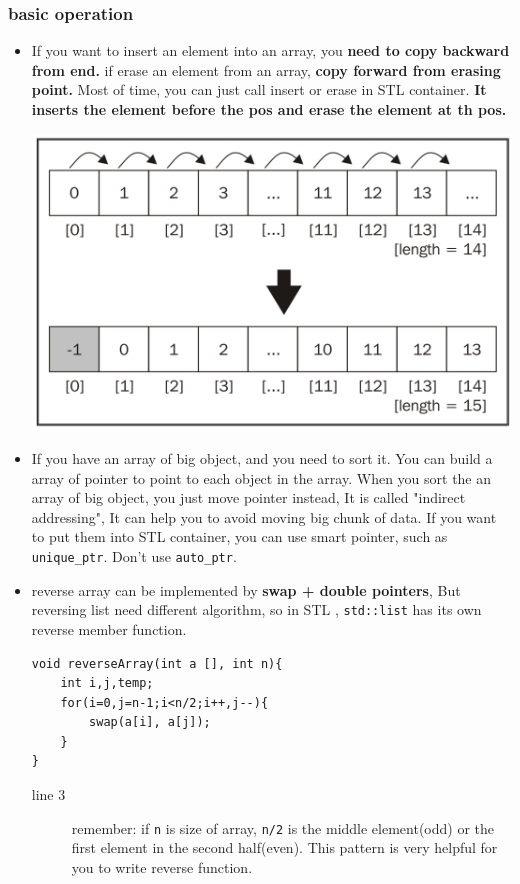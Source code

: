 \documentclass[a4paper,11pt,twoside]{book}
\begin{document}
\subsubsection{basic operation}

\begin{itemize}
\item If you want to insert an element into an array, you  \textbf{need to copy backward from end. }
if erase an element from an array, \textbf{copy forward from erasing point.} Most of time, you can just call insert or erase in STL container. \textbf{It inserts the element before the pos and erase the element at th pos.}

\includegraphics[scale=0.35]{pics/array_insert.png} \newline

\item If you have an array of big object, and you need to sort it. You can build a array of pointer to point to each object in the array. When you sort the an array of big object,  you just move pointer instead, It is called "indirect addressing", It can help you to avoid moving big chunk of data.  If you want to put them into STL container, you can use smart pointer, such as \texttt{unique\_ptr}. Don't use \texttt{auto\_ptr}. 

\item reverse array can be implemented by \textbf{swap + double pointers}, But reversing list need different algorithm, so in STL , \texttt{std::list} has its own reverse member function. 
\begin{lstlisting}[breaklines]
void reverseArray(int a [], int n){
	int i,j,temp;
	for(i=0,j=n-1;i<n/2;i++,j--){
		swap(a[i], a[j]);
	}
}
\end{lstlisting}
\begin{description}
	\item[line 3] remember: if \texttt{n} is size of array, \texttt{n/2} is the middle element(odd) or the first element in the second half(even). This pattern is very helpful for you to write reverse function. 
\end{description}


\end{itemize}
\end{document}
